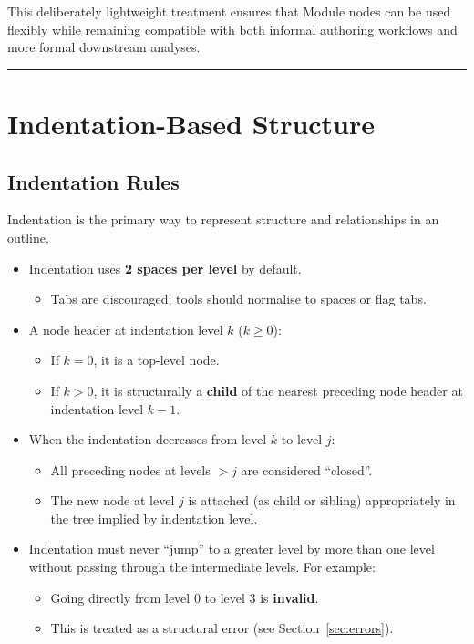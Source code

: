 \documentclass[11pt,twoside,a4paper]{article}
\begin{document}
This deliberately lightweight treatment ensures that Module nodes can be used
flexibly while remaining compatible with both informal authoring workflows and
more formal downstream analyses.


\bigskip
\hrule
\bigskip

\section{Indentation-Based Structure}

\subsection{Indentation Rules}

Indentation is the primary way to represent structure and relationships in an outline.

\begin{itemize}[leftmargin=2em]
  \item Indentation uses \textbf{2 spaces per level} by default.
  \begin{itemize}[leftmargin=1.5em]
    \item Tabs are discouraged; tools should normalise to spaces or flag tabs.
  \end{itemize}

  \item A node header at indentation level \(k\) (\(k \geq 0\)):
  \begin{itemize}[leftmargin=1.5em]
    \item If \(k = 0\), it is a top-level node.
    \item If \(k > 0\), it is structurally a \textbf{child} of the nearest preceding node header at indentation level \(k - 1\).
  \end{itemize}

  \item When the indentation decreases from level \(k\) to level \(j\):
  \begin{itemize}[leftmargin=1.5em]
    \item All preceding nodes at levels \(> j\) are considered ``closed''.
    \item The new node at level \(j\) is attached (as child or sibling) appropriately in the tree implied by indentation level.
  \end{itemize}

  \item Indentation must never ``jump'' to a greater level by more than one level without passing through the intermediate levels. For example:
  \begin{itemize}[leftmargin=1.5em]
    \item Going directly from level 0 to level 3 is \textbf{invalid}.
    \item This is treated as a structural error (see Section~\ref{sec:errors}).
  \end{itemize}
\end{itemize}
\end{document}

